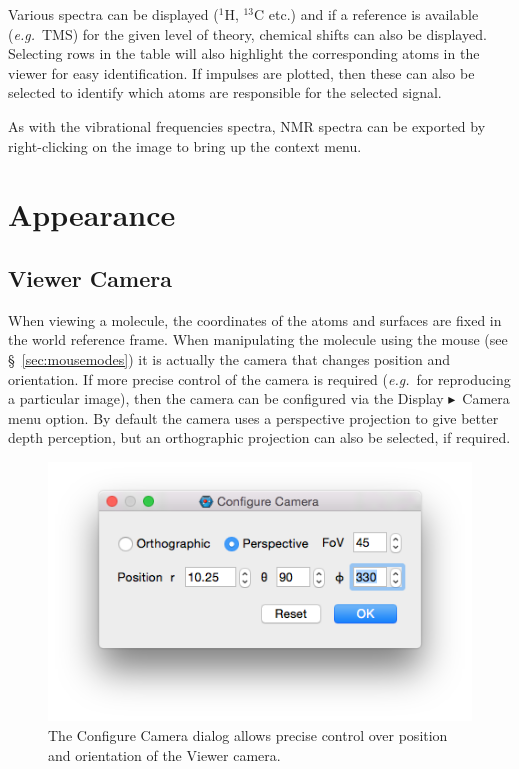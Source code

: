 \documentclass[a4paper,12pt]{article}
\newcommand{\bt}{\ensuremath{\blacktriangleright}}
\newcommand{\eg}{\emph{e.g.}}
\begin{document}
Various spectra can be displayed ($^1$H, $^{13}$C etc.) and if 
a reference is available (\eg\ TMS) for the given level of theory, 
chemical shifts can also be displayed.  Selecting rows in the table
will also highlight the corresponding atoms in the viewer for easy
identification.  If impulses are plotted, then these can also be selected
to identify which atoms are responsible for the selected signal.

As with the vibrational frequencies spectra, NMR spectra can be exported
by right-clicking on the image to bring up the context menu.


\newpage
\section{Appearance}

\subsection{Viewer Camera}

When viewing a molecule, the coordinates of the atoms and surfaces are fixed in
the world reference frame.  When manipulating the molecule using the mouse (see
\S\ \ref{sec:mousemodes}) it is actually the camera that changes position and
orientation.  If more precise control of the camera is required (\eg\ for
reproducing a particular image), then the camera can be configured via the
Display \bt\ Camera menu option.  By default the camera uses a perspective
projection to give better depth perception, but an orthographic projection can
also be selected, if required.

\begin{figure}[h]
\begin{center}
\includegraphics[scale=0.25]{figures/CameraDialog.png}
\caption{The Configure Camera dialog allows precise control over position and orientation
of the Viewer camera.}
\end{center}
\end{figure}
\end{document}
